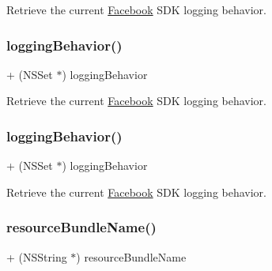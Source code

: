 Retrieve the current \hyperlink{interfaceFacebook}{Facebook} S\+DK logging behavior. \mbox{\label{interfaceFBSettings_a6fe525188c97270c4d4a6781c4d6ee11}} 
\subsubsection{\texorpdfstring{logging\+Behavior()}{loggingBehavior()}\hspace{0.1cm}{\footnotesize\ttfamily [4/5]}}
{\footnotesize\ttfamily + (N\+S\+Set $\ast$) logging\+Behavior \begin{DoxyParamCaption}{ }\end{DoxyParamCaption}}

Retrieve the current \hyperlink{interfaceFacebook}{Facebook} S\+DK logging behavior. \mbox{\label{interfaceFBSettings_a6fe525188c97270c4d4a6781c4d6ee11}} 
\subsubsection{\texorpdfstring{logging\+Behavior()}{loggingBehavior()}\hspace{0.1cm}{\footnotesize\ttfamily [5/5]}}
{\footnotesize\ttfamily + (N\+S\+Set $\ast$) logging\+Behavior \begin{DoxyParamCaption}{ }\end{DoxyParamCaption}}

Retrieve the current \hyperlink{interfaceFacebook}{Facebook} S\+DK logging behavior. \mbox{\label{interfaceFBSettings_ad87ff4e3c9577a22d9a329b12137f976}} 
\subsubsection{\texorpdfstring{resource\+Bundle\+Name()}{resourceBundleName()}\hspace{0.1cm}{\footnotesize\ttfamily [1/5]}}
{\footnotesize\ttfamily + (N\+S\+String $\ast$) resource\+Bundle\+Name \begin{DoxyParamCaption}{ }\end{DoxyParamCaption}}

